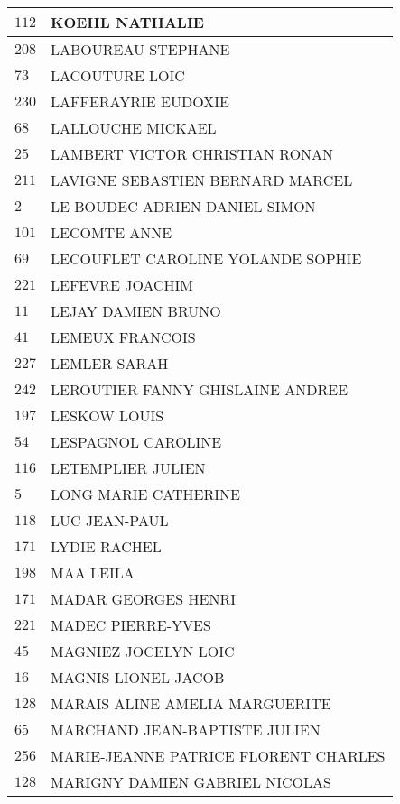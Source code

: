 \begin{xltabular}{\linewidth}{|l|X|}
    \hline
    $112$ & KOEHL NATHALIE \\
    \hline
    $208$ & LABOUREAU STEPHANE \\
    \hline
    $73$ & LACOUTURE LOIC \\
    \hline
    $230$ & LAFFERAYRIE EUDOXIE \\
    \hline
    $68$ & LALLOUCHE MICKAEL \\
    \hline
    $25$ & LAMBERT VICTOR CHRISTIAN RONAN \\
    \hline
    $211$ & LAVIGNE SEBASTIEN BERNARD MARCEL \\
    \hline
    $2$ & LE BOUDEC ADRIEN DANIEL SIMON \\
    \hline
    $101$ & LECOMTE ANNE \\
    \hline
    $69$ & LECOUFLET CAROLINE YOLANDE SOPHIE \\
    \hline
    $221$ & LEFEVRE JOACHIM \\
    \hline
    $11$ & LEJAY DAMIEN BRUNO \\
    \hline
    $41$ & LEMEUX FRANCOIS \\
    \hline
    $227$ & LEMLER SARAH \\
    \hline
    $242$ & LEROUTIER FANNY GHISLAINE ANDREE \\
    \hline
    $197$ & LESKOW LOUIS \\
    \hline
    $54$ & LESPAGNOL CAROLINE \\
    \hline
    $116$ & LETEMPLIER JULIEN \\
    \hline
    $5$ & LONG MARIE CATHERINE \\
    \hline
    $118$ & LUC JEAN-PAUL \\
    \hline
    $171$ & LYDIE RACHEL \\
    \hline
    $198$ & MAA LEILA \\
    \hline
    $171$ & MADAR GEORGES HENRI \\
    \hline
    $221$ & MADEC PIERRE-YVES \\
    \hline
    $45$ & MAGNIEZ JOCELYN LOIC \\
    \hline
    $16$ & MAGNIS LIONEL JACOB \\
    \hline
    $128$ & MARAIS ALINE AMELIA MARGUERITE \\
    \hline
    $65$ & MARCHAND JEAN-BAPTISTE JULIEN \\
    \hline
    $256$ & MARIE-JEANNE PATRICE FLORENT CHARLES \\
    \hline
    $128$ & MARIGNY DAMIEN GABRIEL NICOLAS \\

\end{xltabular}
